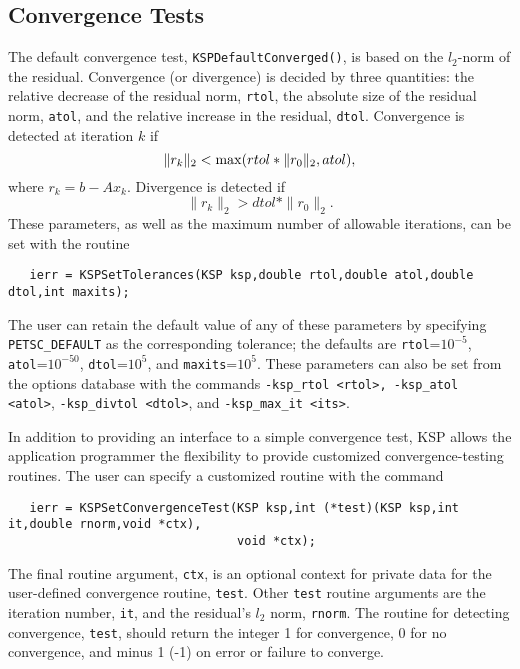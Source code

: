 \subsection{Convergence Tests}
\label{section:convergencetests}

The default convergence test, {\tt KSPDefaultConverged()}, is 
based on the $l_2$-norm of the residual. Convergence 
(or divergence) is decided by three quantities:
the relative decrease of the residual norm, {\tt rtol}, the absolute 
size of the residual norm, {\tt atol}, and the relative increase in the 
residual, {\tt dtol}.  Convergence is detected at iteration $ k $ if
\[  \| r_k \|_2 < {\rm max} ( rtol * \| r_0 \|_2, atol ), \]
where $r_k = b - A x_k$.  Divergence is detected if
\[  \| r_k \|_2 > dtol * \| r_0 \|_2. \]
These parameters, as well as the maximum number of allowable iterations, 
can be set with the routine 
\begin{verbatim}
   ierr = KSPSetTolerances(KSP ksp,double rtol,double atol,double dtol,int maxits);
\end{verbatim}
The user can retain the default value of any of these parameters by
specifying {\tt PETSC\_DEFAULT}  as the 
corresponding tolerance; the
defaults are {\tt rtol}=$10^{-5}$, {\tt atol}=$10^{-50}$,
{\tt dtol}=$10^{5}$, and {\tt maxits}=$10^5$.
These parameters can also be set from the options database with the 
commands {\tt -ksp\_rtol <rtol>, -ksp\_atol <atol>}, {\tt -ksp\_divtol <dtol>},
  
and {\tt -ksp\_max\_it <its>}. 

In addition to providing an interface to a simple convergence test,
KSP allows the application programmer the flexibility to provide 
customized convergence-testing routines.  
The user can specify a customized 
routine with the command 
\begin{verbatim}
   ierr = KSPSetConvergenceTest(KSP ksp,int (*test)(KSP ksp,int it,double rnorm,void *ctx),
                                void *ctx);
\end{verbatim}
The final routine argument, {\tt ctx}, is an optional context for private
data for the user-defined convergence routine, {\tt test}.  Other
{\tt test} routine arguments are the iteration
number, {\tt it}, and the residual's $ l_2 $ norm, {\tt rnorm}.
The routine for detecting convergence, {\tt test}, should return the 
integer 1 for convergence, 0 for no convergence, and minus 1 (-1) on error or 
failure to converge.  
 
